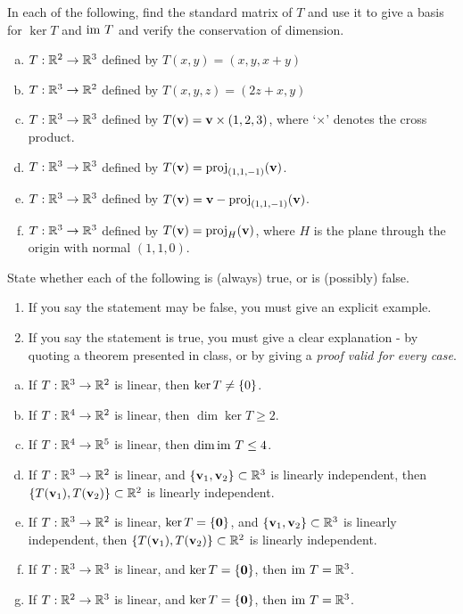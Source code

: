 \begin{prob}
\begin{enumerate}[a)]
\end{enumerate} 

\end{prob} \begin{prob} \label{prob24.2} In each of the following, find the standard matrix of $T$ and use it to give a basis for $\ker T$ and $\operatorname{im}\, T$ and verify the conservation of dimension.

\medskip
\begin{enumerate}[a)]
\item $T:\mathbb{R}^2 \to \mathbb{R}^3$ defined by $T(x,y)=(x, y, x+y)$
\medskip
%
\item\sov $T:\mathbb{R}^3 \to \mathbb{R}^2$ defined by $T(x,y,z)=(2 z+x, y)$
\medskip
%
\item $T:\mathbb{R}^3 \to \mathbb{R}^3$ defined by $T(\mathbf{v})= \mathbf{v}\times (1,2,3)$, where `$\times$' denotes the cross product.
\medskip
%
\item\sov $T:\mathbb{R}^3 \to \mathbb{R}^3$ defined by $T(\mathbf{v})= \operatorname{proj}_{(1,1,-1)}(\mathbf{v})$.
\medskip
%
\item $T:\mathbb{R}^3 \to \mathbb{R}^3$ defined by $T(\mathbf{v})= \mathbf{v}-\operatorname{proj}_{(1,1,-1)}(\mathbf{v})$.
\medskip
%
\item\sov $T:\mathbb{R}^3 \to \mathbb{R}^3$ defined by $T(\mathbf{v})= \operatorname{proj}_H(\mathbf{v})$, where $H$ is the plane through the origin with normal $(1,1,0)$.
\medskip
%
\end{enumerate}

\end{prob} \begin{prob} \label{prob24.3} State whether each of the following is (always) true,
or is (possibly) false.    
   \smallskip    
\begin{enumerate}[$\bullet$]
\item If you say the statement may be false, you must give an explicit example.   
\item If you say the statement is true, you must give a clear explanation -   by quoting a theorem presented in class, or by giving a {\it proof valid for every  case}. 
\end{enumerate}
\medskip
\begin{enumerate}[a)]
\item If $T:\mathbb{R}^3 \to \mathbb{R}^2$ is linear, then $\ker T \not= \{0 \}$.
\medskip
%
\item\sov If $T:\mathbb{R}^4 \to \mathbb{R}^2$ is linear, then $\dim \ker T \ge 2$.
\medskip
% 
\item If $T:\mathbb{R}^4 \to \mathbb{R}^5$ is linear, then $\dim \operatorname{im}\, T \le 4$.
\medskip
%
\item\sov If $T:\mathbb{R}^3 \to \mathbb{R}^2$ is linear, and $\{\mathbf{v}_1,\mathbf{v}_2 \} \subset \mathbb{R}^3$ is linearly independent, then $\{T(\mathbf{v}_1),T(\mathbf{v}_2) \} \subset \mathbb{R}^2$ is linearly independent.
\medskip
%
\item If $T:\mathbb{R}^3 \to \mathbb{R}^2$ is linear, $\ker T=\{\mathbf{0} \}$, and $\{\mathbf{v}_1,\mathbf{v}_2 \} \subset \mathbb{R}^3$ is linearly independent, then $\{T(\mathbf{v}_1),T(\mathbf{v}_2) \} \subset \mathbb{R}^2$ is linearly independent.
\medskip
%
\item\sov If $T:\mathbb{R}^3 \to \mathbb{R}^3$ is linear, and $\ker T=\{\mathbf{0} \}$, then $\operatorname{im}\, T=\mathbb{R}^3$.
\medskip
%
\item If $T:\mathbb{R}^2 \to \mathbb{R}^3$ is linear, and $\ker T=\{\mathbf{0} \}$, then $\operatorname{im}\, T=\mathbb{R}^3$.


\end{enumerate}
\end{prob}
